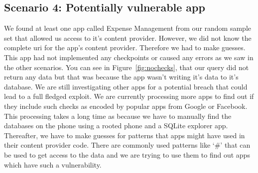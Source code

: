 \subsection{Scenario 4: Potentially vulnerable app} We found at least one app called Expense Management from our random sample set that allowed us access to it's content provider. However, we did not know the complete uri for the app's content provider. Therefore we had to make guesses. This app had not implemented any checkpoints or caused any errors as we saw in the other scenarios. You can see in Figure~\ref{fig:nochecks}, that our query did not return any data but that was because the app wasn't writing it's data to it's database. We are still investigating other apps for a potential breach that could lead to a full fledged exploit. We are currently processing more apps to find out if they include such checks as encoded by popular apps from Google or Facebook. This processing takes a long time as because we have to manually find the databases on the phone using a rooted phone and a SQLite explorer app. Thereafter, we have to make guesses for patterns that apps might have used in their content provider code. There are commonly used patterns like `\#' that can be used to get access to the data and we are trying to use them to find out apps which have such a vulnerability.